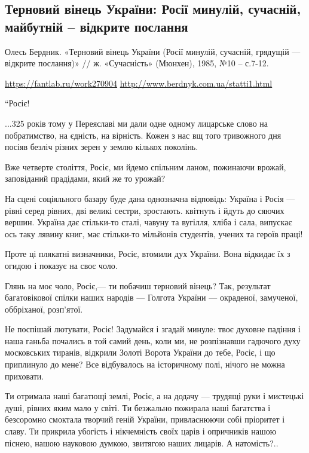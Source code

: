  
 

\subsection{Терновий вінець України: Росії минулій, сучасній, майбутній – відкрите послання}

Олесь Бердник. «Терновий вінець України (Росії минулій, сучасній, грядущій —
відкрите послання)» // ж. «Сучасність» (Мюнхен), 1985, №10 – с.7-12.

\url{https://fantlab.ru/work270904}
\url{http://www.berdnyk.com.ua/statti1.html}

``Росіє!

...325 років тому у Переяславі ми дали одне одному лицарське слово на
побратимство, на єдність, на вірність. Кожен з нас вщ того тривожного дня
посіяв безліч різних зерен у землю кількох поколінь.

Вже четверте століття, Росіє, ми йдемо спільним ланом, пожинаючи врожай,
заповіданий прадідами, який же то урожай?

На сцені соціяльного базару буде дана однозначна відповідь: Україна і Росія —
рівні серед рівних, дві великі сестри, зростають. квітнуть і йдуть до сяючих
вершин. Україна дає стільки-то сталі, чавуну та вугілля, хліба і сала, випускає
ось таку лявину книг, має стільки-то мільйонів студентів, учених та героїв
праці!

Проте ці плякатні визначники, Росіє, втомили дух України. Вона відкидає їх з
огидою і показує на своє чоло.

Глянь на моє чоло, Росіє,— ти побачиш терновий вінець? Так, результат
багатовікової спілки наших народів — Голгота України — окраденої, замученої,
оббріханої, розп'ятої.

Не поспішай лютувати, Росіє! Задумайся і згадай минуле: твоє духовне падіння і
наша ганьба почались в той самий день, коли ми, не розпізнавши гадючого духу
московських тиранів, відкрили Золоті Ворота України до тебе, Росіє, і що
приплинуло до мене? Все відбувалось на історичному полі, нічого не можна
приховати.

Ти отримала наші багатющі землі, Росіє, а на додачу — трудящі руки і мистецькі
душі, рівних яким мало у світі. Ти безжально пожирала наші багатства і
безсоромно смоктала творчий геній України, привласнюючи собі пріоритет і славу.
Ти прикрила убогість і нікчемність своїх царів і опричників нашою піснею, нашою
науковою думкою, звитягою наших лицарів. А натомість?..

